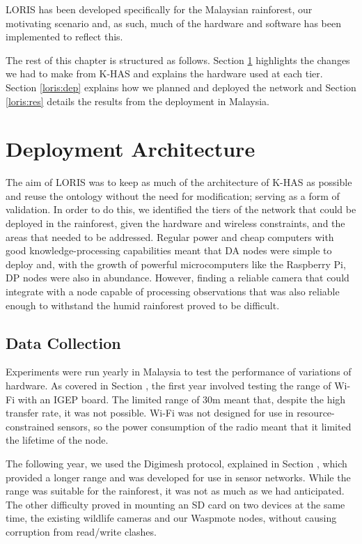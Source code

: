 	LORIS has been developed specifically for the Malaysian rainforest, our motivating scenario and, as such, much of the hardware and software has been implemented to reflect this.
	
	The rest of this chapter is structured as follows. Section \ref{loris:arch} highlights the changes we had to make from K-HAS and explains the hardware used at each tier. Section \ref{loris:dep} explains how we planned and deployed the network and Section \ref{loris:res} details the results from the deployment in Malaysia.
	
	\section{ Deployment Architecture}\label{loris:arch}
		The aim of LORIS was to keep as much of the architecture of K-HAS as possible and reuse the ontology without the need for modification; serving as a form of validation. In order to do this, we identified the tiers of the network that could be deployed in the rainforest, given the hardware and wireless constraints, and the areas that needed to be addressed. Regular power and cheap computers with good knowledge-processing capabilities meant that DA nodes were simple to deploy and, with the growth of powerful microcomputers like the Raspberry Pi, DP nodes were also in abundance. However, finding a reliable camera that could integrate with a node capable of processing observations that was also reliable enough to withstand the humid rainforest proved to be difficult.
		
		\subsection{Data Collection}
				Experiments were run yearly in Malaysia to test the performance of variations of hardware. As covered in Section \label{tech:wifirange}, the first year involved testing the range of Wi-Fi with an IGEP board. The limited range of 30m meant that, despite the high transfer rate, it was not possible. Wi-Fi was not designed for use in resource-constrained sensors, so the power consumption of the radio meant that it limited the lifetime of the node.
				
				The following year, we used the Digimesh protocol, explained in Section \label{tech:digimesh}, which provided a longer range and was developed for use in sensor networks.  While the range was suitable for the rainforest, it was not as much as we had anticipated. The other difficulty proved in mounting an SD card on two devices at the same time, the existing wildlife cameras and our Waspmote nodes, without causing corruption from read/write clashes.
				
